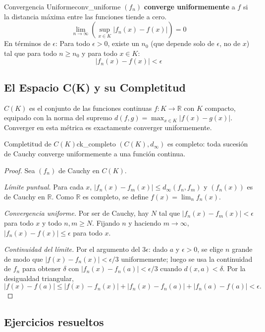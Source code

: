 \documentclass[11pt, a4paper]{article}
\begin{document}
\begin{definicion}{Convergencia Uniforme}{conv_uniforme}
$(f_n)$ \textbf{converge uniformemente} a $f$ si la distancia máxima entre las funciones tiende
a cero.
$$ \lim_{n \to \infty} \left( \sup_{x \in K} |f_n(x) - f(x)| \right) = 0 $$
En términos de $\epsilon$: Para todo $\epsilon > 0$, existe un $n_0$ (que depende solo de
$\epsilon$, no de $x$) tal que para todo $n \ge n_0$ y para todo $x \in K$:
$$ |f_n(x) - f(x)| < \epsilon $$
\end{definicion}

\subsection{El Espacio C(K) y su Completitud}

$C(K)$ es el conjunto de las funciones continuas $f: K \to \mathbb{R}$ con $K$ compacto, equipado
con la norma del supremo $d(f, g) = \max_{x \in K} |f(x) - g(x)|$. Converger en esta métrica es
exactamente converger uniformemente.

\begin{teorema}{Completitud de $C(K)$}{ck_completo}
$(C(K), d_\infty)$ es completo: toda sucesión de Cauchy converge uniformemente a una función
continua.
\end{teorema}

\begin{proof}
Sea $(f_n)$ de Cauchy en $C(K)$.

\textit{Límite puntual.} Para cada $x$, $|f_n(x) - f_m(x)| \le d_\infty(f_n, f_m)$ y $(f_n(x))$ es
de Cauchy en $\mathbb{R}$. Como $\mathbb{R}$ es completo, se define $f(x) = \lim_n f_n(x)$.

\textit{Convergencia uniforme.} Por ser de Cauchy, hay $N$ tal que $|f_n(x) - f_m(x)| < \epsilon$
para todo $x$ y todo $n, m \ge N$. Fijando $n$ y haciendo $m \to \infty$,
$|f_n(x) - f(x)| \le \epsilon$ para todo $x$.

\textit{Continuidad del límite.} Por el argumento del $3\epsilon$: dado $a$ y $\epsilon > 0$, se
elige $n$ grande de modo que $|f(x) - f_n(x)| < \epsilon/3$ uniformemente; luego se usa la
continuidad de $f_n$ para obtener $\delta$ con $|f_n(x) - f_n(a)| < \epsilon/3$ cuando
$d(x, a) < \delta$. Por la desigualdad
triangular,
$$ |f(x) - f(a)| \le |f(x) - f_n(x)| + |f_n(x) - f_n(a)| + |f_n(a) - f(a)| < \epsilon. $$
\end{proof}

\newpage

\subsection{Ejercicios resueltos}
\end{document}
